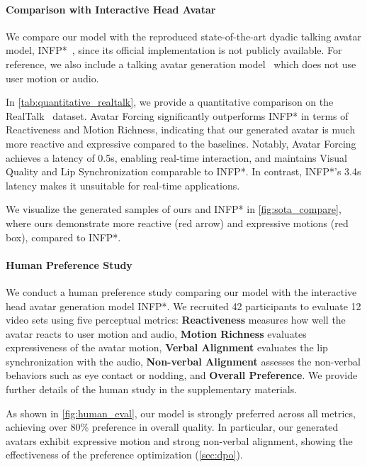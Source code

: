 \paragraph{Comparison with Interactive Head Avatar}
We compare our model with the reproduced state-of-the-art dyadic talking avatar model, INFP*~\citep{infp}, since its official implementation is not publicly available. For reference, we also include a talking avatar generation model~\citep{float} which does not use user motion or audio.

In \cref{tab:quantitative_realtalk}, we provide a quantitative comparison on the RealTalk~\citep{realtalk} dataset. Avatar Forcing significantly outperforms INFP* in terms of Reactiveness and Motion Richness, indicating that our generated avatar is much more reactive and expressive compared to the baselines.
Notably, Avatar Forcing achieves a latency of 0.5s, enabling real-time interaction, and maintains Visual Quality and Lip Synchronization comparable to INFP*. In contrast, INFP*'s 3.4s latency makes it unsuitable for real-time applications.

We visualize the generated samples of ours and INFP* in \cref{fig:sota_compare}, where ours demonstrate more reactive (red arrow) and expressive motions (red box), compared to INFP*. 

\vspace{-0.05in}
\paragraph{Human Preference Study}
We conduct a human preference study comparing our model with the interactive head avatar generation model INFP*. We recruited 42 participants to evaluate 12 video sets using five perceptual metrics: \textbf{Reactiveness} measures how well the avatar reacts to user motion and audio, \textbf{Motion Richness} evaluates expressiveness of the avatar motion, \textbf{Verbal Alignment} evaluates the lip synchronization with the audio, \textbf{Non-verbal Alignment} assesses the non-verbal behaviors such as eye contact or nodding, and \textbf{Overall Preference}. We provide further details of the human study in the supplementary materials.

As shown in \cref{fig:human_eval}, our model is strongly preferred across all metrics, achieving over 80\% preference in overall quality. In particular,  our generated avatars exhibit expressive motion and strong non-verbal alignment, showing the effectiveness of the preference optimization (\cref{sec:dpo}).


